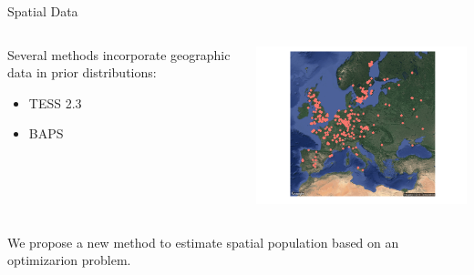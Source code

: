 \documentclass{beamer}\usepackage[]{graphicx}\usepackage[]{color}
\begin{document}
\begin{frame}{Spatial Data}

\begin{columns}
\begin{column}{0.5\textwidth}
Several methods incorporate geographic data in prior distributions:
\begin{itemize}
  \item TESS 2.3~\citep{durand2009spatial}
  \item BAPS~\citep{corander2008bayesian}
\end{itemize}

\end{column}
\begin{column}{0.5\textwidth}  %
    \begin{center}
    \includegraphics{map.pdf}
     \end{center}
\end{column}
\end{columns}
We propose a new method to estimate spatial population based on an optimizarion 
problem.
\end{frame}
\end{document}
